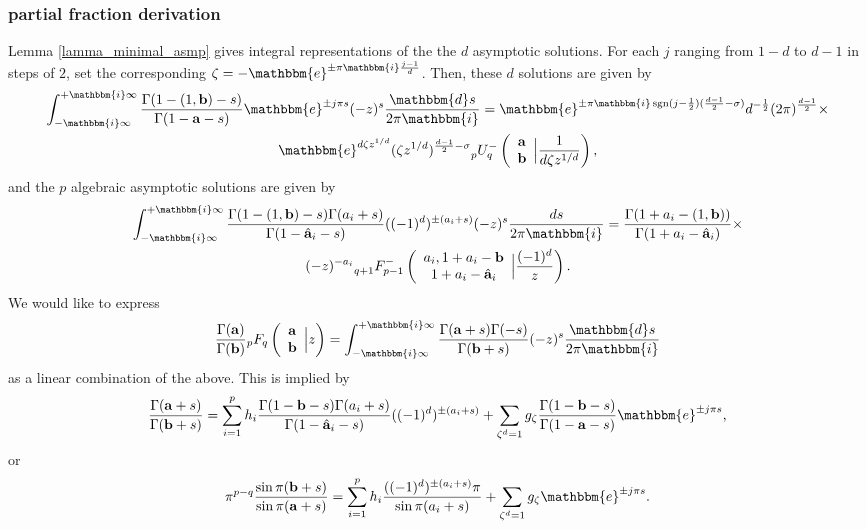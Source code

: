 \documentclass[12pt]{article}
\newcommand{\ee}[0] {\mathbbm{e}}
\newcommand{\ii}[0] {\mathbbm{i}}
\newcommand{\dd}[0] {\mathbbm{d}}
\numberwithin{equation}{section}
\newcommand{\FF}[6] {{}_{#1}{#2}_{#3} \left( \begin{array}{c} #4 \\ #5 \end{array} \Big| {#6}  \right)}
\newcommand{\FFe}[7] {{}_{#1}^{\,}{#2}_{#3}^{#4} \left( \begin{array}{c} #5 \\ #6 \end{array} \Big| {#7} \right)}
\newcommand{\bfa}[0] {\mathbf{a}}
\newcommand{\bfb}[0] {\mathbf{b}}
\begin{document}
\subsubsection{partial fraction derivation}
Lemma \ref{lamma_minimal_asmp} gives integral representations of the the $d$ asymptotic solutions. For each $j$ ranging from $1-d$ to $d-1$ in steps of $2$, set the corresponding $\zeta = -\ee^{\pm \pi \ii \frac{j-1}{d}}$. Then, these $d$ solutions are given by
\begin{gather*}
\int_{-\ii \infty}^{+\ii \infty} \frac{\Gamma(1-(1,\bfb)-s)}{\Gamma(1-\bfa-s)} \ee^{\pm j \pi s} (-z)^s \frac{\dd s}{2\pi \ii} = 
\ee^{\pm \pi \ii \operatorname{sgn}(j-\frac{1}{2}) (\frac{d-1}{2}-\sigma)} d^{-\frac{1}{2}} (2\pi)^{\frac{d-1}{2}} \times \\
\ee^{d \zeta z^{1/d}}(\zeta z^{1/d})^{\frac{d-1}{2}-\sigma} \FFe{p}{U}{q}{-}{\bfa}{\bfb}{\frac{1}{d\zeta z^{1/d}}}\text{,}
\end{gather*}
and the $p$ algebraic asymptotic solutions are given by
\begin{gather*}
\int_{-\ii \infty}^{+\ii \infty} \frac{\Gamma(1-(1,\bfb)-s)\Gamma(a_i+s)}{\Gamma(1-\hat{\bfa}_i-s)} ((-1)^d)^{\pm (a_i+s)} (-z)^s \frac{ds}{2\pi \ii} =
\frac{\Gamma(1+a_i-(1,\bfb))}{\Gamma(1+a_i-\hat{\bfa}_i)} \times \\
(-z)^{-a_i} \FFe{q+1}{F}{p-1}{-}{a_i,1+a_i-\mathbf{b}}{1+a_i-\hat{\mathbf{a}}_i}{\frac{(-1)^d}{z}}\text{.}
\end{gather*}
We would like to express
\begin{equation*}
\frac{\Gamma(\mathbf{a})}{\Gamma(\mathbf{b})}\FF{p}{F}{q}{\mathbf{a}}{\mathbf{b}}{z} = \int_{-\ii \infty}^{+\ii \infty} \frac{\Gamma(\mathbf{a}+s) \Gamma(-s)}{\Gamma(\mathbf{b}+s)} (-z)^s \frac{\dd s}{2\pi \ii}
\end{equation*}
as a linear combination of the above. This is implied by
\begin{equation*}
\frac{\Gamma(\mathbf{a}+s)}{\Gamma(\mathbf{b}+s)} = \sum_{i=1}^{p} h_i \frac{\Gamma(1-\bfb-s)\Gamma(a_i+s)}{\Gamma(1-\hat{\bfa}_i-s)} ((-1)^d)^{\pm (a_i+s)} + \sum_{\zeta^d = 1} g_{\zeta} \frac{\Gamma(1-\bfb-s)}{\Gamma(1-\bfa-s)} \ee^{\pm j \pi s}\text{,}
\end{equation*}
or
\begin{equation*}
\pi^{p-q} \frac{\sin \pi(\bfb + s) } {\sin \pi(\bfa + s)}
 = \sum_{i=1}^{p} h_i \frac{((-1)^d)^{\pm (a_i+s)} \pi}{\sin \pi(a_i+s)} + \sum_{\zeta^d = 1} g_{\zeta} \ee^{\pm j \pi s}\text{.}
\end{equation*}
\end{document}
